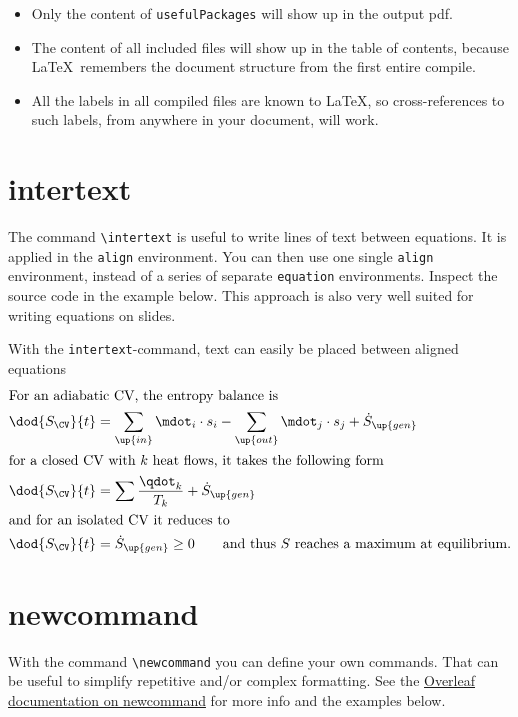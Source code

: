 \begin{enumerate}
\begin{itemize}
            \item Only the content of \verb|usefulPackages| will show up in the output pdf.
            \item The content of all included files will show up in the table of contents, because \LaTeX\ remembers the document structure from the first entire compile.
            \item All the labels in all compiled files are known to \LaTeX, so cross-references to such labels, from anywhere in your document, will work.
        \end{itemize}
\end{enumerate}

\section{intertext}
The command \verb|\intertext| is useful to write lines of text between equations. It is applied in the \verb|align| environment. You can then use one single \verb|align| environment, instead of a series of separate \verb|equation| environments. Inspect the source code in the example below. This approach is also very well suited for writing equations on slides.
\begin{frame}{With the \texttt{intertext}-command, text can easily be placed between aligned equations}
    \begin{align}
        \intertext{For an adiabatic CV, the entropy balance is} 
        &\dod{S_\CV}{t}=\sum_\up{in}\mdot_i\cdot s_i-\sum_\up{out}\mdot_j\cdot s_j+\dot{S}_\up{gen}\\
        \intertext{for a closed CV with $k$ heat flows, it takes the following form}
        &\dod{S_\CV}{t}=\sum\frac{\qdot_k}{T_k}+\dot{S}_\up{gen}\\
        \intertext{and for an isolated CV it reduces to}
        &\dod{S_\CV}{t}=\dot{S}_\up{gen}\geq 0\qquad\text{and thus $S$ reaches a maximum at equilibrium.}
    \end{align} 
\end{frame}

\section{newcommand}
With the command \verb|\newcommand| you can define your own commands. That can be useful to simplify repetitive and/or complex formatting. See the \href{https://www.overleaf.com/learn/latex/Commands#Defining_a_new_command}{Overleaf documentation on newcommand} for more info and the examples below.

